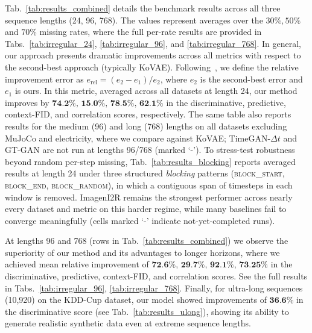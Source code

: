 \documentclass{article}
\theoremstyle{plain}
\theoremstyle{definition}
\theoremstyle{remark}
\begin{document}
Tab.~\ref{tab:results_combined} details the benchmark results across all three sequence lengths (24, 96, 768). The values represent averages over the $30\%, 50\%$ and $70\%$ missing rates, where the full per-rate results are provided in Tabs.~\ref{tab:irregular_24}, \ref{tab:irregular_96}, and \ref{tab:irregular_768}. In general, our approach presents dramatic improvements across all metrics with respect to the second-best approach (typically KoVAE). Following~\cite{naiman2024generative}, we define the relative improvement error as $e_\text{rel} = (e_2-e_1)/e_2$, where $e_2$ is the second-best error and $e_1$ is ours. In this metric, averaged across all datasets at length 24, our method improves by $\textbf{74.2\%, 15.0\%, 78.5\%, 62.1\%}$ in the discriminative, predictive, context-FID, and correlation scores, respectively. The same table also reports results for the medium (96) and long (768) lengths on all datasets excluding MuJoCo and electricity, where we compare against KoVAE; TimeGAN-$\Delta t$ and GT-GAN are not run at lengths 96/768 (marked `-'). To stress-test robustness beyond random per-step missing, Tab.~\ref{tab:results_blocking} reports averaged results at length 24 under three structured \emph{blocking} patterns (\textsc{block\_start}, \textsc{block\_end}, \textsc{block\_random}), in which a contiguous span of timesteps in each window is removed. ImagenI2R remains the strongest performer across nearly every dataset and metric on this harder regime, while many baselines fail to converge meaningfully (cells marked `-' indicate not-yet-completed runs).

\begin{table} %
    \vspace{-3mm}
    \centering
    \caption{Discriminative results of ultra-long (10{,}920) sequences on KDD-Cup for different missing rates.}
    \label{tab:results_ulong}
    \vspace{-2mm}
\end{table}
At lengths 96 and 768 (rows in Tab.~\ref{tab:results_combined}) we observe the superiority of our method and its advantages to longer horizons, where we achieved mean relative improvement of $\textbf{72.6\%, 29.7\%, 92.1\%, 73.25\%}$ in the discriminative, predictive, context-FID, and correlation scores. See the full results in Tabs.~\ref{tab:irregular_96}, \ref{tab:irregular_768}. Finally, for ultra-long sequences (10{,}920) on the KDD-Cup dataset, our model showed improvements of $\textbf{36.6\%}$ in the discriminative score (see Tab.~\ref{tab:results_ulong}), showing its ability to generate realistic synthetic data even at extreme sequence lengths.
\end{document}
